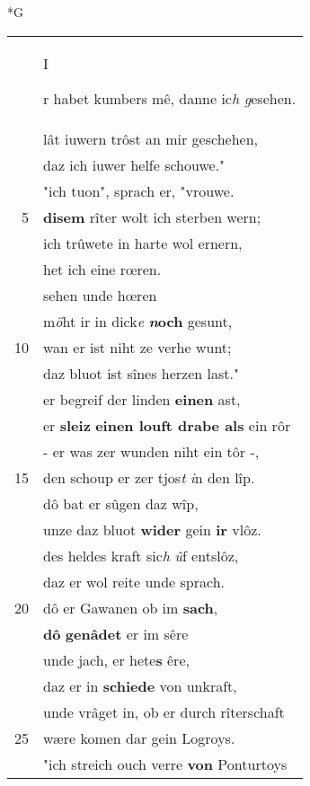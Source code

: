 \documentclass[8pt,a4paper,notitlepage]{article}
\begin{document}
\begin{table}[ht]
\begin{minipage}[t]{0.5\linewidth}
\small
\begin{center}*G
\end{center}
\begin{tabular}{rl}
 & \begin{large}I\end{large}r habet kumbers mê, danne ic\textit{h g}esehen.\\ 
 & lât iuwern trôst an mir geschehen,\\ 
 & daz ich iuwer helfe schouwe."\\ 
 & "ich tuon", sprach er, "vrouwe.\\ 
5 & \textbf{disem} rîter wolt ich sterben wern;\\ 
 & ich trûwete in harte wol ernern,\\ 
 & het ich eine rœren.\\ 
 & sehen unde hœren\\ 
 & m\textit{ö}ht ir in dick\textit{e} \textbf{\textit{n}och} gesunt,\\ 
10 & wan er ist niht ze verhe wunt;\\ 
 & daz bluot ist sînes herzen last."\\ 
 & er begreif der linden \textbf{einen} ast,\\ 
 & er \textbf{sleiz} \textbf{einen louft drabe als} ein rôr\\ 
 & - er was zer wunden niht ein tôr -,\\ 
15 & den schoup er zer tjos\textit{t} \textit{i}n den lîp.\\ 
 & dô bat er sûgen daz wîp,\\ 
 & unze daz bluot \textbf{wider} gein \textbf{ir} vlôz.\\ 
 & des heldes kraft sic\textit{h} \textit{û}f entslôz,\\ 
 & daz er wol reite unde sprach.\\ 
20 & dô er Gawanen ob im \textbf{sach},\\ 
 & \textbf{dô} \textbf{genâdet} er im sêre\\ 
 & unde jach, er hete\textbf{s} êre,\\ 
 & daz er in \textbf{schiede} von unkraft,\\ 
 & unde vrâget in, ob er durch rîterschaft\\ 
25 & wære komen dar gein Logroys.\\ 
 & "ich streich ouch verre \textbf{von} Ponturtoys\\ 

\end{tabular}
\end{minipage}
\end{table}
\end{document}
